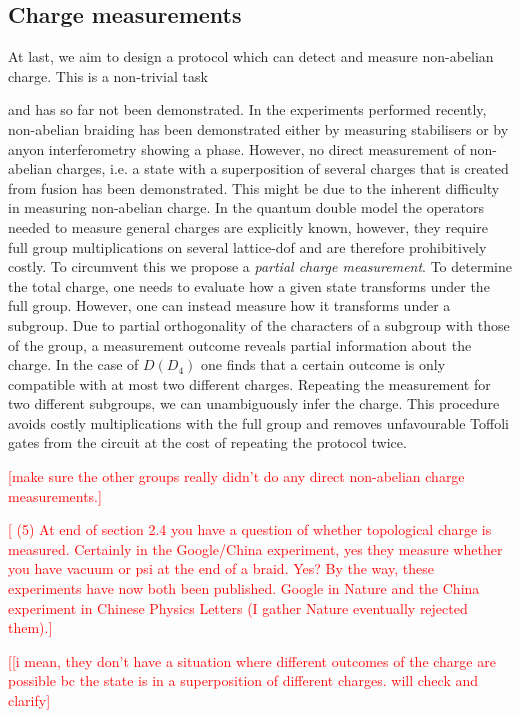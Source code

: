 \documentclass[two column]{article}
\newcommand{\caro}[1]{\textcolor{red}{[#1]}}
\begin{document}
\subsection{Charge measurements}
At last, we aim to design a protocol which can detect and measure non-abelian charge. This is a non-trivial task 

and has so far not been demonstrated. In the experiments performed recently, non-abelian braiding has been demonstrated either by measuring stabilisers \cite{andersen2022observation} or by anyon interferometry showing a phase. However, no direct measurement of non-abelian charges, i.e. a state with a superposition of several charges that is created from fusion has been demonstrated. This might be due to the inherent difficulty in measuring non-abelian charge. In the quantum double model the operators needed to measure general charges are explicitly known, however, they require full group multiplications on several lattice-dof and are therefore prohibitively costly. To circumvent this we propose a \emph{partial charge measurement}. To determine the total charge, one needs to evaluate how a given state transforms under the full group. However, one can instead measure how it transforms under a subgroup. Due to partial orthogonality of the characters of a subgroup with those of the group, a measurement outcome reveals partial information about the charge. In the case of $D(D_4)$ one finds that a certain outcome is only compatible with at most two different charges. Repeating the measurement for two different subgroups, we can unambiguously infer the charge. This procedure avoids costly multiplications with the full group and removes unfavourable Toffoli gates from the circuit at the cost of repeating the protocol twice.

\caro{make sure the other groups really didn't do any direct non-abelian charge measurements.}

\caro{
(5) At end of section 2.4 you have a question of whether topological charge is measured.  Certainly in the Google/China experiment, yes they measure whether you have vacuum or psi at the end of a braid.  Yes?    By the way, these experiments have now both been published.   Google in Nature and the China experiment in Chinese Physics Letters (I gather Nature eventually rejected them).}

\caro{[i mean, they don't have a situation where different outcomes of the charge are possible bc the state is in a superposition of different charges. will check and clarify}
\end{document}
